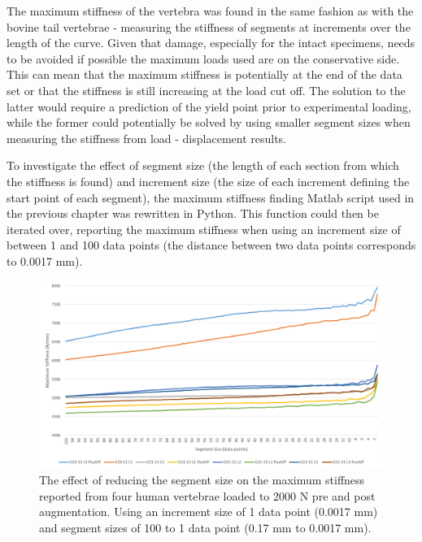 The maximum stiffness of the vertebra was found in the same fashion as with the
bovine tail vertebrae - measuring the stiffness of segments at increments over
the length of the curve. Given that damage, especially for the intact
specimens,
needs to be avoided if possible the maximum loads used are on the conservative side. This
can mean that the maximum stiffness is potentially at the end of the data set
or
that the stiffness is still increasing at the load cut off. The solution to the
latter would require a prediction of the yield point prior to experimental
loading, while the former could
potentially be solved by using smaller segment sizes when measuring the
stiffness from load - displacement results.

To investigate the effect of segment size (the length of each section from which the
stiffness is found) and increment size (the size of each increment defining the
start point of each segment), the maximum stiffness finding Matlab script used
in the previous chapter was
rewritten in Python. This function could then be iterated over, reporting the
maximum stiffness when using an increment size of between 1 and 100 data points
(the distance between two data points corresponds to 0.0017 mm).


\begin{figure}[ht!]
  \centering
 
\includegraphics[width=6in]{Chapters/Chapter_HT_images/findStiffness_1incr.png}

 \caption{The effect of reducing the segment size on the maximum stiffness
    reported from four human vertebrae loaded to 2000 N pre and post
    augmentation. Using an increment size of 1 data point (0.0017 mm) and
    segment sizes of 100 to 1 data point (0.17 mm to 0.0017 mm).}
  \label{fig:findStiffness_1incr}
\end{figure}

